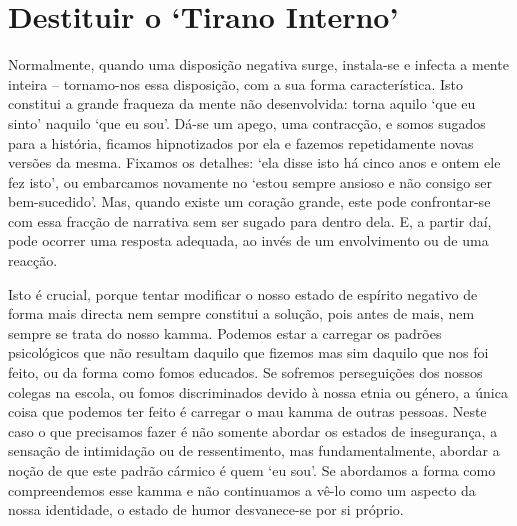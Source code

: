 \section{Destituir o `Tirano Interno'}

Normalmente, quando uma disposição negativa surge, instala-se e infecta a mente
inteira -- tornamo-nos essa disposição, com a sua forma característica. Isto
constitui a grande fraqueza da mente não desenvolvida: torna aquilo `que eu
sinto' naquilo `que eu sou'. Dá-se um apego, uma contracção, e somos sugados
para a história, ficamos hipnotizados por ela e fazemos repetidamente novas
versões da mesma. Fixamos os detalhes: `ela disse isto há cinco anos e ontem ele
fez isto', ou embarcamos novamente no `estou sempre ansioso e não consigo ser
bem-sucedido'. Mas, quando existe um coração grande, este pode confrontar-se com
essa fracção de narrativa sem ser sugado para dentro dela. E, a partir daí, pode
ocorrer uma resposta adequada, ao invés de um envolvimento ou de uma reacção.

\enlargethispage{\baselineskip}

Isto é crucial, porque tentar modificar o nosso estado de espírito negativo de
forma mais directa nem sempre constitui a solução, pois antes de mais, nem
sempre se trata do nosso kamma. Podemos estar a carregar os padrões psicológicos
que não resultam daquilo que fizemos mas sim daquilo que nos foi feito, ou da
forma como fomos educados. Se sofremos perseguições dos nossos colegas na
escola, ou fomos discriminados devido à nossa etnia ou género, a única coisa que
podemos ter feito é carregar o mau kamma de outras pessoas. Neste caso o que
precisamos fazer é não somente abordar os estados de insegurança, a sensação de
intimidação ou de ressentimento, mas fundamentalmente, abordar a noção de que
este padrão cármico é quem `eu sou'. Se abordamos a forma como compreendemos
esse kamma e não continuamos a vê-lo como um aspecto da nossa identidade, o
estado de humor desvanece-se por si próprio.

\enlargethispage{\baselineskip}


